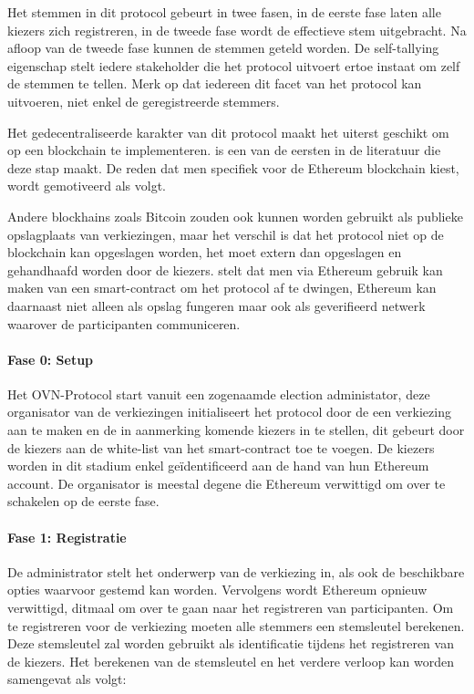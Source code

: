 			Het stemmen in dit protocol gebeurt in twee fasen, in de eerste fase laten alle kiezers zich registreren, in de tweede fase wordt de effectieve stem uitgebracht. Na afloop van de tweede fase kunnen de stemmen geteld worden.  De self-tallying eigenschap stelt iedere stakeholder die het protocol uitvoert ertoe instaat om zelf de stemmen te tellen. Merk op dat iedereen dit facet van het protocol kan uitvoeren, niet enkel de geregistreerde stemmers.
			 
			Het gedecentraliseerde karakter van dit protocol maakt het uiterst geschikt om op een blockchain te implementeren. \textcite{McCorry2017} is een van de eersten in de literatuur die deze stap maakt. De reden dat men specifiek voor de Ethereum blockchain kiest, wordt gemotiveerd als volgt.
			
			Andere blockhains zoals Bitcoin zouden ook kunnen worden gebruikt als publieke opslagplaats van verkiezingen, maar het verschil is dat het protocol niet op de blockchain kan opgeslagen worden, het moet extern dan opgeslagen en gehandhaafd worden door de kiezers. \textcite{McCorry2017} stelt dat men via Ethereum gebruik kan maken van een smart-contract om  het protocol af te dwingen, Ethereum kan daarnaast niet alleen als opslag fungeren maar ook als geverifieerd netwerk waarover de participanten communiceren.
			\paragraph*{Fase 0: Setup }
			Het OVN-Protocol start vanuit een zogenaamde election administator, deze organisator van de verkiezingen initialiseert het protocol door de een verkiezing aan te maken en de in aanmerking komende kiezers in te stellen, dit gebeurt door de kiezers aan de white-list van het smart-contract toe te voegen. De kiezers worden in dit stadium enkel geïdentificeerd aan de hand van hun Ethereum account. De organisator is meestal degene die  Ethereum verwittigd om over te schakelen op de eerste fase.
			\paragraph*{Fase 1: Registratie }
			De administrator stelt het onderwerp van de verkiezing in, als ook de beschikbare opties waarvoor gestemd kan worden. Vervolgens wordt Ethereum opnieuw verwittigd, ditmaal om over te gaan naar het registreren van participanten. Om te registreren voor de verkiezing moeten alle stemmers een stemsleutel berekenen. Deze stemsleutel zal worden gebruikt als identificatie tijdens het registreren van de kiezers. Het berekenen  van de stemsleutel en het verdere verloop kan worden samengevat als volgt: 
			
